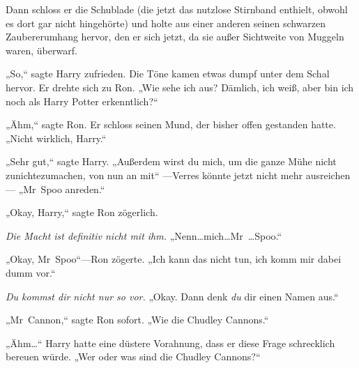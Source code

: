 Dann schloss er die Schublade (die jetzt das nutzlose Stirnband enthielt, obwohl es dort gar nicht hingehörte) und holte aus einer anderen seinen schwarzen Zaubererumhang hervor, den er sich jetzt, da sie außer Sichtweite von Muggeln waren, überwarf.

„So,“ sagte Harry zufrieden. Die Töne kamen etwas dumpf unter dem Schal hervor. Er drehte sich zu Ron. „Wie sehe ich aus? Dämlich, ich weiß, aber bin ich noch als Harry Potter erkenntlich?“

„Ähm,“ sagte Ron. Er schloss seinen Mund, der bisher offen gestanden hatte. „Nicht wirklich, Harry.“

„Sehr gut,“ sagte Harry. „Außerdem wirst du mich, um die ganze Mühe nicht zunichtezumachen, von nun an mit“ —Verres könnte jetzt nicht mehr ausreichen— „Mr~Spoo anreden.“

„Okay, Harry,“ sagte Ron zögerlich.

\emph{Die Macht ist definitiv nicht mit ihm.} „Nenn…mich…Mr~…Spoo.“

„Okay, Mr~Spoo“—Ron zögerte. „Ich kann das nicht tun, ich komm mir dabei dumm vor.“

\emph{Du kommst dir nicht nur so vor.} „Okay. Dann denk \emph{du} dir einen Namen aus.“

„Mr~Cannon,“ sagte Ron sofort. „Wie die Chudley Cannons.“

„Ähm…“ Harry hatte eine düstere Vorahnung, dass er diese Frage schrecklich bereuen würde. „Wer oder was sind die Chudley Cannons?“

